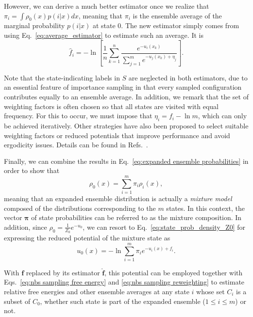 \documentclass[aip,jcp,reprint,amsmath,amssymb]{revtex4-1}
\newcommand{\vt}[1]{\boldsymbol{\mathbf{#1}}}           %
\begin{document}
However, we can derive a much better estimator once we realize that $\pi_i = \int \rho_0(x) p(i|x) dx$, meaning that $\pi_i$ is the ensemble average of the marginal probability $p(i|x)$ at state $0$. The new estimator simply comes from using Eq.~\eqref{eq:average_estimator} to estimate such an average. It is
\begin{equation}
\label{eq:expanded ensemble FEP estimator}
\hat f_i = -\ln \left[ \frac{1}{n}\sum_{k=1}^n \frac{e^{-u_i(x_k)}}{\sum_{j=1}^m e^{-u_j(x_k) + \eta_j}} \right].
\end{equation}

Note that the state-indicating labels in $S$ are neglected in both estimators, due to an essential feature of importance sampling in that every sampled configuration contributes equally to an ensemble average. In addition, we remark that the set of weighting factors is often chosen so that all states are visited with equal frequency. For this to occur, we must impose that $\eta_i = f_i - \ln m$, which can only be achieved iteratively. Other strategies have also been proposed to select suitable weighting factors or reduced potentials that improve performance and avoid ergodicity issues. Details can be found in Refs.~.

Finally, we can combine the results in Eq.~\eqref{eq:expanded ensemble probabilities} in order to show that
\begin{equation}
\label{eq:mixture ensemble}
\rho_0(x) = \sum_{i=1}^m \pi_i \rho_i(x),
\end{equation}
meaning that an expanded ensemble distribution is actually a \textit{mixture model}\cite{Lindsay_1995, Marin_2005} composed of the distributions corresponding to the $m$ states. In this context, the vector $\vt \pi$ of state probabilities can be referred to as the mixture composition. In addition, since $\rho_0 = \frac{1}{Z_0}e^{-u_0}$, we can resort to Eq.~\eqref{eq:state_prob_density_Z0} for expressing the reduced potential of the mixture state as
\begin{equation}
\label{eq:mixture potential}
u_0(x) = -\ln \sum_{i=1}^m \pi_i e^{-u_i(x) + f_i}.
\end{equation}

With $\vt f$ replaced by its estimator $\hat{\vt f}$, this potential can be employed together with Eqs.~\eqref{eq:nbs sampling free energy} and \eqref{eq:nbs sampling reweighting} to estimate relative free energies and other ensemble averages at any state $i$ whose set $C_i$ is a subset of $C_0$, whether such state is part of the expanded ensemble ($1 \le i \le m$) or not.
\end{document}
